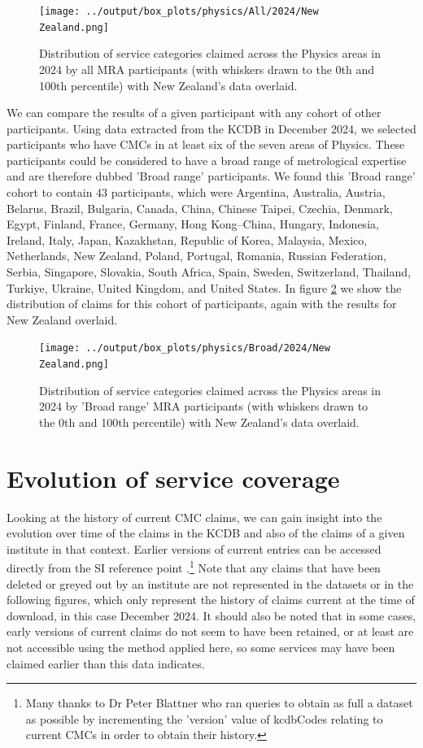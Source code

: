 \documentclass[
	a4paper, %
	10pt, %
	unnumberedsections, %
	twoside, %
]{LTJournalArticle}
\begin{document}
\begin{figure}[!htpb]
    \centering
    \texttt{[image: ../output/box\_plots/physics/All/2024/New Zealand.png]}
    \caption{Distribution of service categories claimed across the Physics areas in 2024 by all MRA participants (with whiskers drawn to the 0th and 100th percentile) with New Zealand's data overlaid.}
    \label{fig:physics_all_nz}
\end{figure}
We can compare the results of a given participant with any cohort of other participants. Using data extracted from the KCDB in December 2024, we selected participants who have CMCs in at least six of the seven areas of Physics. These participants could be considered to have a broad range of metrological expertise and are therefore dubbed 'Broad range' participants.
We found this 'Broad range' cohort to contain 43 participants, which were Argentina, Australia, Austria, Belarus, Brazil, Bulgaria, Canada, China, Chinese Taipei, Czechia, Denmark, Egypt, Finland, France, Germany, Hong Kong--China, Hungary, Indonesia, Ireland, Italy, Japan, Kazakhstan, Republic of Korea, Malaysia, Mexico, Netherlands, New Zealand, Poland, Portugal, Romania, Russian Federation, Serbia, Singapore, Slovakia, South Africa, Spain, Sweden, Switzerland, Thailand, Turkiye, Ukraine, United Kingdom, and United States.
In figure \ref{fig:physics_broad_nz} we show the distribution of claims for this cohort of participants, again with the results for New Zealand overlaid.

\begin{figure}[!htpb]
    \centering
    \texttt{[image: ../output/box\_plots/physics/Broad/2024/New Zealand.png]}
    \caption{Distribution of service categories claimed across the Physics areas in 2024 by 'Broad range' MRA participants (with whiskers drawn to the 0th and 100th percentile) with New Zealand's data overlaid.}
    \label{fig:physics_broad_nz}
\end{figure}

\section{Evolution of service coverage}

Looking at the history of current CMC claims, we can gain insight into the evolution over time of the claims in the KCDB and also of the claims of a given institute in that context. Earlier versions of current entries can be accessed directly from the SI reference point \cite{SIRef}.\footnote{Many thanks to Dr Peter Blattner who ran queries to obtain as full a dataset as possible by incrementing the 'version' value of kcdbCodes relating to current CMCs in order to obtain their history.} Note that any claims that have been deleted or greyed out by an institute are not represented in the datasets or in the following figures, which only represent the history of claims current at the time of download, in this case December 2024. It should also be noted that in some cases, early versions of current claims do not seem to have been retained, or at least are not accessible using the method applied here, so some services may have been claimed earlier than this data indicates.
\end{document}
